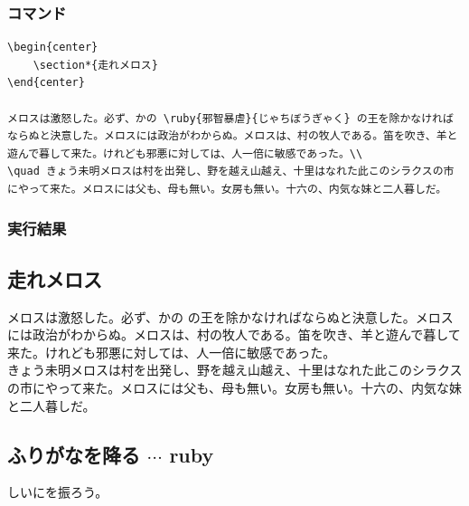 \documentclass[a4j, titlepage]{jarticle}
\begin{document}
\begin{multicols}{2}

\subsubsection*{コマンド}
\begin{lstlisting}
\begin{center}
    \section*{走れメロス}
\end{center}

メロスは激怒した。必ず、かの \ruby{邪智暴虐}{じゃちぼうぎゃく} の王を除かなければならぬと決意した。メロスには政治がわからぬ。メロスは、村の牧人である。笛を吹き、羊と遊んで暮して来た。けれども邪悪に対しては、人一倍に敏感であった。\\
\quad きょう未明メロスは村を出発し、野を越え山越え、十里はなれた此このシラクスの市にやって来た。メロスには父も、母も無い。女房も無い。十六の、内気な妹と二人暮しだ。
\end{lstlisting}

\vfill\null
\columnbreak

\subsubsection*{実行結果}
\begin{screen}
    \begin{center}
        \section*{走れメロス}
    \end{center}

    メロスは激怒した。必ず、かの  の王を除かなければならぬと決意した。メロスには政治がわからぬ。メロスは、村の牧人である。笛を吹き、羊と遊んで暮して来た。けれども邪悪に対しては、人一倍に敏感であった。\\
    \quad きょう未明メロスは村を出発し、野を越え山越え、十里はなれた此このシラクスの市にやって来た。メロスには父も、母も無い。女房も無い。十六の、内気な妹と二人暮しだ。

\end{screen}
\end{multicols}


\subsection{ふりがなを降る $\cdots$ ruby}
しいにを振ろう。
\end{document}
